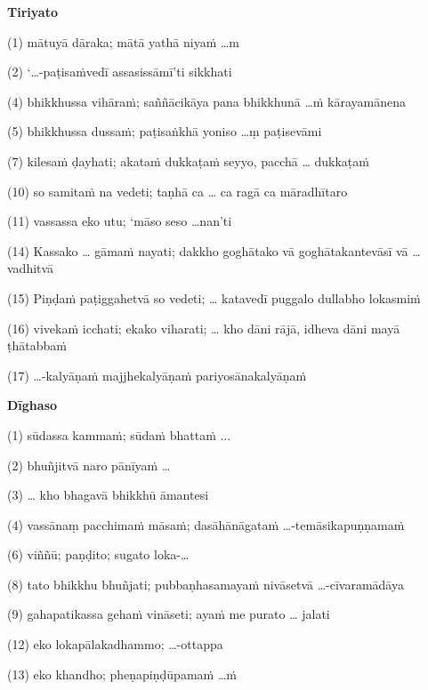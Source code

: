 {\raggedright

\textbf{Tiriyato}

(1) mātuyā dāraka; mātā yathā niyaṁ \ldots{}m

(2) `\ldots{}-paṭisaṁvedī assasissāmī'ti sikkhati

(4) bhikkhussa vihāraṁ; saññācikāya pana bhikkhunā \ldots{}ṁ kārayamānena

(5) bhikkhussa dussaṁ; paṭisaṅkhā yoniso \ldots{}ṃ paṭisevāmi

(7) kilesaṁ ḍayhati; akataṁ dukkaṭaṁ seyyo, pacchā \ldots{} dukkaṭaṁ

(10) so samitaṁ na vedeti; taṇhā ca \ldots{} ca ragā ca māradhītaro

(11) vassassa eko utu; `māso seso \ldots{}nan'ti

(14) Kassako \ldots{} gāmaṁ nayati; dakkho goghātako vā goghātakantevāsī vā \ldots{} vadhitvā

(15) Piṇḍaṁ paṭiggahetvā so vedeti; \ldots{} katavedī puggalo dullabho lokasmiṁ

(16) vivekaṁ icchati; ekako viharati; \ldots{} kho dāni rājā, idheva dāni mayā ṭhātabbaṁ

(17) \ldots{}-kalyāṇaṁ majjhekalyāṇaṁ pariyosānakalyāṇaṁ

\textbf{Dīghaso}

(1) sūdassa kammaṁ; sūdaṁ bhattaṁ ...

(2) bhuñjitvā naro pānīyaṁ \ldots{}

(3) \ldots{} kho bhagavā bhikkhū āmantesi

(4) vassānaṃ pacchimaṁ māsaṁ; dasāhānāgataṁ \ldots{}-temāsikapuṇṇamaṁ

(6) viññū; paṇḍito; sugato loka-\ldots{}

(8) tato bhikkhu bhuñjati; pubbaṇhasamayaṁ nivāsetvā \ldots{}-cīvaramādāya

(9) gahapatikassa gehaṁ vināseti; ayaṁ me purato \ldots{} jalati

(12) eko lokapālakadhammo; \ldots{}-ottappa

(13) eko khandho; pheṇapiṇḍūpamaṁ \ldots{}ṁ

}
\par
